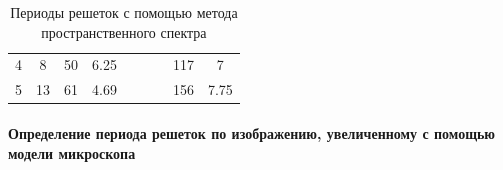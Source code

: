 \documentclass[a4paper,12pt]{article}
\begin{document}
\begin{enumerate}
\begin{table}[h!]
\begin{tabular}{|c|c|c|l|c|c|c|c|c|}
4       & 8     & 50          & 6.25  &                    &                       &                                   & 117    & 7               \\ \cline{1-4} \cline{8-9} 
5       & 13    & 61          & 4.69  &                    &                       &                                   & 156    & 7.75            \\ \hline
\end{tabular}
\caption{Периоды решеток с помощью метода пространственного спектра}
\end{table} 
\end{enumerate}
\paragraph{Определение периода решеток по изображению, увеличенному с помощью модели микроскопа}
\end{document}
